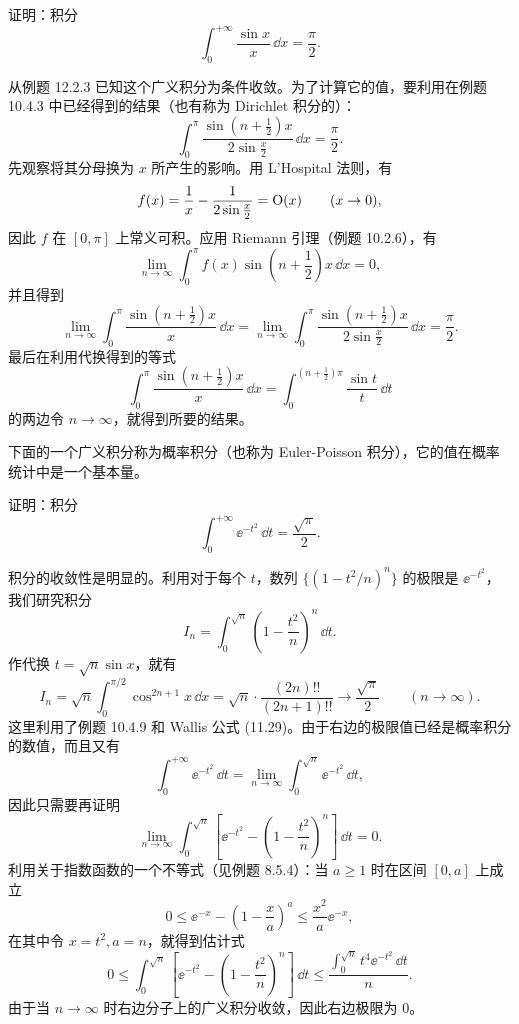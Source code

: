 \begin{xexample}[12.3.6（Dirichlet 积分）]
证明：积分
\[
  \int_0^{+\infty}\frac{\sin x}{x}\,\dd x=\frac\pi2.
\]
\end{xexample}
\begin{xsolution}
从例题 12.2.3 已知这个广义积分为条件收敛。为了计算它的值，要利用在例题 10.4.3 中已经得到的结果（也有称为 Dirichlet 积分的）：
\[
  \int_0^\pi\frac{\sin\left(n+\frac12\right)x}{2\sin\frac x2}\,\dd x=\frac\pi2.
\]
先观察将其分母换为 $x$ 所产生的影响。用 L'Hospital 法则，有
\[
  f(x)=\frac1x-\frac1{2\sin\frac x2}=\mathrm{O}(x)\qquad(x\to0),
\]
因此 $f$ 在 $[0,\pi]$ 上常义可积。应用 Riemann 引理（例题 10.2.6），有
\[
  \lim_{n\to\infty}\int_0^\pi f(x)\sin\left(n+\frac12\right)x\,\dd x=0,
\]
并且得到
\[
  \lim_{n\to\infty}\int_0^\pi\frac{\sin\left(n+\frac12\right)x}{x}\,\dd x
  =\lim_{n\to\infty}\int_0^\pi\frac{\sin\left(n+\frac12\right)x}{2\sin\frac x2}\,\dd x=\frac\pi2.
\]
最后在利用代换得到的等式
\[
  \int_0^\pi\frac{\sin\left(n+\frac12\right)x}{x}\,\dd x
  =\int_0^{(n+\frac12)\pi}\frac{\sin t}{t}\,\dd t
\]
的两边令 $n\to\infty$，就得到所要的结果。
\end{xsolution}

下面的一个广义积分称为概率积分（也称为 Euler-Poisson 积分），它的值在概率统计中是一个基本量。

\begin{xexample}
证明：积分
\[
  \int_0^{+\infty}\ee^{-t^2}\,\dd t=\frac{\sqrt\pi}{2}.
\]
\end{xexample}
\begin{xsolution}
积分的收敛性是明显的。利用对于每个 $t$，数列 $\{(1-t^2/n)^n\}$ 的极限是 $\ee^{-t^2}$，我们研究积分
\[
  I_n=\int_0^{\sqrt n}\left(1-\frac{t^2}n\right)^n\,\dd t.
\]
作代换 $t=\sqrt n\sin x$，就有
\[
  I_n=\sqrt n\int_0^{\pi/2}\cos^{2n+1}x\,\dd x
  =\sqrt n\cdot\frac{(2n)!!}{(2n+1)!!}\to\frac{\sqrt\pi}{2}\qquad(n\to\infty).
\]
这里利用了例题 10.4.9 和 Wallis 公式 (11.29)。由于右边的极限值已经是概率积分的数值，而且又有
\[
  \int_0^{+\infty}\ee^{-t^2}\,\dd t
  =\lim_{n\to\infty}\int_0^{\sqrt n}\ee^{-t^2}\,\dd t,
\]
因此只需要再证明
\[
  \lim_{n\to\infty}\int_0^{\sqrt n}\left[\ee^{-t^2}-\left(1-\frac{t^2}n\right)^n\right]\,\dd t=0.
\]
利用关于指数函数的一个不等式（见例题 8.5.4）：当 $a\geq1$ 时在区间 $[0,a]$ 上成立
\begin{equation}
  0\leq\ee^{-x}-\left(1-\frac xa\right)^a\leq\frac{x^2}{a}\ee^{-x},
  \tag{12.7}
  \label{eq:12.7}
\end{equation}
在其中令 $x=t^2,a=n$，就得到估计式
\[
  0\leq\int_0^{\sqrt n}\left[\ee^{-t^2}-\left(1-\frac{t^2}n\right)^n\right]\,\dd t
  \leq\frac{\int_0^{\sqrt n}t^4\ee^{-t^2}\,\dd t}{n}.
\]
由于当 $n\to\infty$ 时右边分子上的广义积分收敛，因此右边极限为 0。
\end{xsolution}


